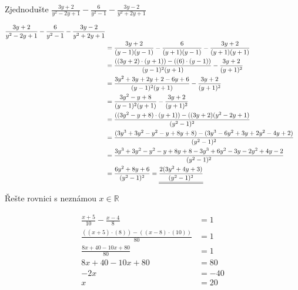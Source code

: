 \begin{example}
    Zjednodušte $\frac{3y+2}{y^2-2y+1} - \frac{6}{y^2-1} - \frac{3y-2}{y^2+2y+1}$
\end{example} 
\begin{align*}
    \frac{3y+2}{y^2-2y+1} - \frac{6}{y^2-1} - \frac{3y-2}{y^2+2y+1} 
    \\ &= \frac{3y+2}{(y-1)(y-1)} - \frac{6}{(y+1)(y-1)} - \frac{3y+2}{(y+1)(y+1)} 
    \\ &= \frac{((3y+2)\cdot(y+1))-((6)\cdot(y-1))}{(y-1)^2(y+1)} - \frac{3y+2}{(y+1)^2}
    \\ &= \frac{3y^2+3y+2y+2-6y+6}{(y-1)^2(y+1)} - \frac{3y+2}{(y+1)^2}
    \\ &= \frac{3y^2-y+8}{(y-1)^2(y+1)} - \frac{3y+2}{(y+1)^2}
    \\ &= \frac{((3y^2-y+8)\cdot(y+1))-((3y+2)(y^2-2y+1)}{(y^2-1)^2}
    \\ &= \frac{(3y^3+3y^2-y^2-y+8y+8)-(3y^3-6y^2+3y+2y^2-4y+2)}{(y^2-1)^2}
    \\ &= \frac{3y^3+3y^2-y^2-y+8y+8-3y^3+6y^2-3y-2y^2+4y-2}{(y^2-1)^2}
    \\ &= \frac{6y^2+8y+6}{(y^2-1)^2}
    = \underline{\underline{\frac{2(3y^2+4y+3)}{(y^2-1)^2}}}
\end{align*}
\page
\begin{example}
    Řešte rovnici s neznámou $x \in \mathbb{R} $ 
\end{example}
\begin{align*}
    \frac{x+5}{10} - \frac{x-4}{8} &= 1
    \\ \frac{((x+5)\cdot(8)) - ((x-8)\cdot(10))}{80} &= 1
    \\ \frac{8x+40 - 10x +80}{80} &= 1
    \\ 8x + 40 - 10x + 80 &= 80
    \\ -2x  &= -40
    \\   x  &=20
\end{align*}
\page
